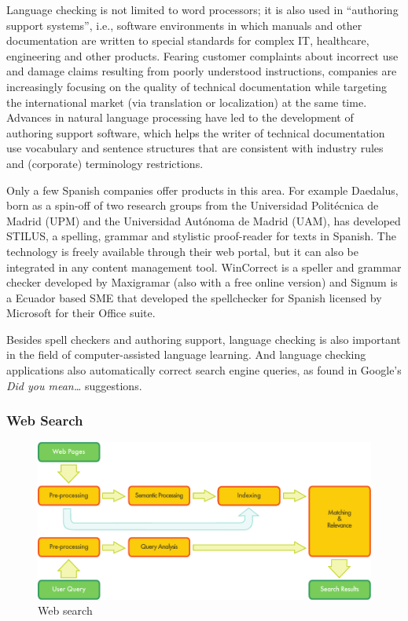 \begin{multicols}{2}

Language checking is not limited to word processors; it is also used in “authoring support systems”, i.e., software environments in which manuals and other documentation are written to special standards for complex IT, healthcare, engineering and other products. Fearing customer complaints about incorrect use and damage claims resulting from poorly understood instructions, companies are increasingly focusing on the quality of technical documentation while targeting the international market (via translation or localization) at the same time. Advances in natural language processing have led to the development of authoring support software, which helps the writer of technical documentation use vocabulary and sentence structures that are consistent with industry rules and (corporate) terminology restrictions.

Only a few Spanish companies offer products in this area. For example Daedalus, born as a spin-off of two research groups from the Universidad Politécnica de Madrid (UPM) and the Universidad Autónoma de Madrid (UAM), has developed STILUS, a spelling, grammar and stylistic proof-reader for texts in Spanish. The technology is freely available through their web portal, but it can also be integrated in any content management tool. WinCorrect is a speller and grammar checker developed by Maxigramar (also with a free online version) and Signum is a Ecuador based SME that developed the spellchecker for Spanish licensed by Microsoft for their Office suite.

Besides spell checkers and authoring support, language checking is also important in the field of computer-assisted language learning. And language checking applications also automatically correct search engine queries, as found in Google's \textit{Did you mean\ldots} suggestions.

\subsubsection{Web Search}

\begin{figure}[htb]
  \center
  \includegraphics[width=\textwidth]{../_media/english/web_search_architecture}
  \caption{Web search}
  \label{fig:websearcharch_en}
 \end{figure}


\end{multicols}
